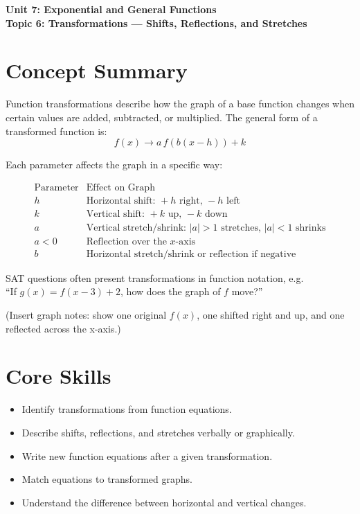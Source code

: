 \documentclass[12pt]{article}
\begin{document}
\begin{center}
    \LARGE \textbf{Unit 7: Exponential and General Functions} \\[6pt]
    \Large \textbf{Topic 6: Transformations — Shifts, Reflections, and Stretches}
\end{center}

\vspace{1em}

\section*{Concept Summary}

Function transformations describe how the graph of a base function changes when certain values are added, subtracted, or multiplied.  
The general form of a transformed function is:
\[
f(x) \rightarrow a\,f(b(x - h)) + k
\]

Each parameter affects the graph in a specific way:

\[
\begin{array}{c|l}
\text{Parameter} & \text{Effect on Graph} \\ \hline
h & \text{Horizontal shift: } +h \text{ right, } -h \text{ left} \\
k & \text{Vertical shift: } +k \text{ up, } -k \text{ down} \\
a & \text{Vertical stretch/shrink: } |a|>1 \text{ stretches, } |a|<1 \text{ shrinks} \\
a<0 & \text{Reflection over the } x\text{-axis} \\
b & \text{Horizontal stretch/shrink or reflection if negative}
\end{array}
\]

SAT questions often present transformations in function notation, e.g. \\
“If \(g(x) = f(x - 3) + 2\), how does the graph of \(f\) move?”

(Insert graph notes: show one original \(f(x)\), one shifted right and up, and one reflected across the x-axis.)

\section*{Core Skills}
\begin{itemize}
  \item Identify transformations from function equations.
  \item Describe shifts, reflections, and stretches verbally or graphically.
  \item Write new function equations after a given transformation.
  \item Match equations to transformed graphs.
  \item Understand the difference between horizontal and vertical changes.
\end{itemize}
\end{document}
